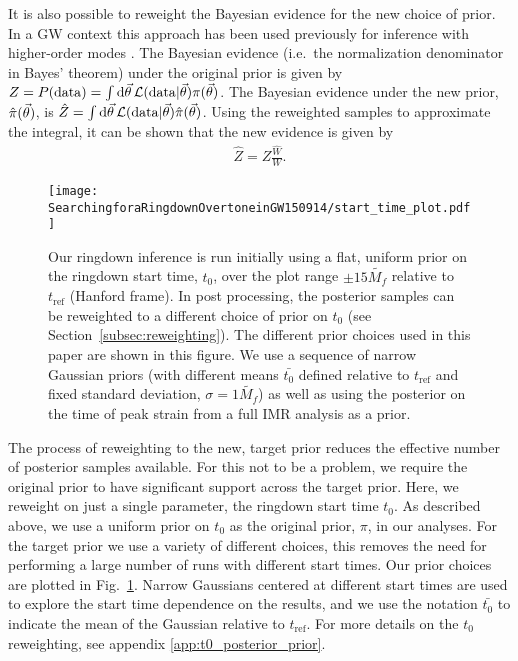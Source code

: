 It is also possible to reweight the Bayesian evidence for the new choice of prior.
In a GW context this approach has been used previously for inference with higher-order modes \cite{Payne:2019wmy}.
The Bayesian evidence (i.e.\ the normalization denominator in Bayes' theorem) under the original prior is given by $Z=P(\mathrm{data})=\int\mathrm{d}\vec{\theta}\,\mathcal{L}(\mathrm{data}|\vec{\theta})\pi(\vec{\theta})$.
The Bayesian evidence under the new prior, $\hat{\pi}(\vec{\theta})$, is $\hat{Z}=\int\mathrm{d}\vec{\theta}\,\mathcal{L}(\mathrm{data}|\vec{\theta})\hat{\pi}(\vec{\theta})$. Using the reweighted samples to approximate the integral, it can be shown that the new evidence is given by
\begin{align}\label{eq:new_evidence}
	\hat{Z} = Z\frac{\hat{W}}{W}.
\end{align}

\begin{figure}[t]
    \centering
    \texttt{[image: SearchingforaRingdownOvertoneinGW150914/start\_time\_plot.pdf]}
    \caption[Different prior choices for the ringdown start time used for the GW150914 analysis]{ 
    Our ringdown inference is run initially using a flat, uniform prior on the ringdown start time, $t_0$, over the plot range $\pm 15 \tilde{M_f}$ relative to $t_\mathrm{ref}$ (Hanford frame).
    In post processing, the posterior samples can be reweighted to a different choice of prior on $t_0$ (see Section~\ref{subsec:reweighting}). 
    The different prior choices used in this paper are shown in this figure. 
    We use a sequence of narrow Gaussian priors (with different means $\bar{t_0}$ defined relative to $t_\mathrm{ref}$ and fixed standard deviation, $\sigma=1\tilde{M_f}$) as well as using the posterior on the time of peak strain from a full IMR analysis as a prior.
    }
    \label{fig:start_time}
\end{figure}

The process of reweighting to the new, target prior reduces the effective number of posterior samples available.
For this not to be a problem, we require the original prior to have significant support across the target prior.
Here, we reweight on just a single parameter, the ringdown start time $t_0$.
As described above, we use a uniform prior on $t_0$ as the original prior, $\pi$, in our analyses.
For the target prior we use a variety of different choices, this removes the need for performing a large number of runs with different start times. 
Our prior choices are plotted in Fig.~\ref{fig:start_time}.
Narrow Gaussians centered at different start times are used to explore the start time dependence on the results, and we use the notation $\bar{t_0}$ to indicate the mean of the Gaussian relative to $t_\mathrm{ref}$. 
For more details on the $t_0$ reweighting, see appendix \ref{app:t0_posterior_prior}.

